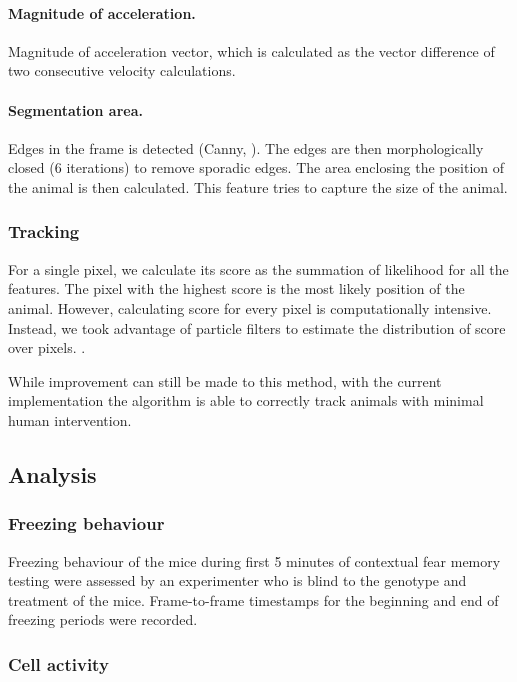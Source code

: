 \paragraph{Magnitude of acceleration.} Magnitude of acceleration vector, which is calculated as the vector difference of two consecutive velocity calculations. 

\paragraph{Segmentation area.} Edges in the frame is detected (Canny, ). The edges are then morphologically closed (6 iterations) to remove sporadic edges. The area enclosing the position of the animal is then calculated. This feature tries to capture the size of the animal.

\subsubsection{Tracking}

For a single pixel, we calculate its score as the summation of likelihood for all the features. The pixel with the highest score is the most likely position of the animal. However, calculating score for every pixel is computationally intensive. Instead, we took advantage of particle filters to estimate the distribution of score over pixels. .

While improvement can still be made to this method, with the current implementation the algorithm is able to correctly track animals with minimal human intervention. 


\subsection{Analysis}

\subsubsection{Freezing behaviour}
Freezing behaviour of the mice during first 5 minutes of contextual fear memory testing were assessed by an experimenter who is blind to the genotype and treatment of the mice. Frame-to-frame timestamps for the beginning and end of freezing periods were recorded.

\subsubsection{Cell activity}

